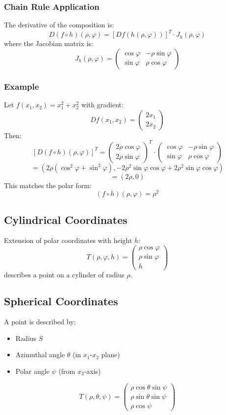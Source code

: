 \documentclass{article}
\begin{document}
\subsubsection{Chain Rule Application}
The derivative of the composition is:
\[
D(f \circ h)(\rho, \varphi) = [Df(h(\rho, \varphi))]^T \cdot J_h(\rho, \varphi)
\]
where the Jacobian matrix is:
\[
J_h(\rho, \varphi) = 
\begin{pmatrix}
\cos \varphi & -\rho \sin \varphi \\
\sin \varphi & \rho \cos \varphi
\end{pmatrix}
\]

\subsubsection{Example}
Let $f(x_1, x_2) = x_1^2 + x_2^2$ with gradient:
\[
Df(x_1, x_2) =
\begin{pmatrix}
2x_1 \\
2x_2
\end{pmatrix}
\]
Then:
\[
[D(f \circ h)(\rho, \varphi)]^T = 
\begin{pmatrix}
2\rho \cos \varphi \\
2\rho \sin \varphi
\end{pmatrix}^T 
\cdot 
\begin{pmatrix}
\cos \varphi & -\rho \sin \varphi \\
\sin \varphi & \rho \cos \varphi
\end{pmatrix}
\]
\[
= \left(2\rho (\cos^2 \varphi + \sin^2 \varphi), -2\rho^2 \sin \varphi \cos \varphi + 2\rho^2 \sin \varphi \cos \varphi\right)
\]
\[
= (2\rho, 0)
\]
This matches the polar form:
\[
(f \circ h)(\rho, \varphi) = \rho^2
\]

\subsection{Cylindrical Coordinates}
Extension of polar coordinates with height $h$:
\[
T(\rho, \varphi, h) = 
\begin{pmatrix}
\rho \cos \varphi \\
\rho \sin \varphi \\
h
\end{pmatrix}
\]
describes a point on a cylinder of radius $\rho$.

\subsection{Spherical Coordinates}
A point is described by:
\begin{itemize}
    \item Radius $S$
    \item Azimuthal angle $\theta$ (in $x_1$-$x_2$ plane)
    \item Polar angle $\psi$ (from $x_3$-axis)
\end{itemize}
\[
T(\rho, \theta, \psi) = 
\begin{pmatrix}
\rho \cos \theta \sin \psi \\
\rho \sin \theta \sin \psi \\
\rho \cos \psi
\end{pmatrix}
\]
\vspace{20mm}
\end{document}
